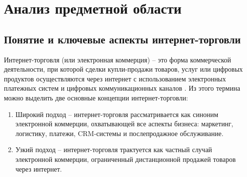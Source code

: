 \section{Анализ предметной области}
\subsection{Понятие и ключевые аспекты интернет-торговли}

Интернет-торговля (или электронная коммерция) – это форма коммерческой деятельности, при которой сделки купли-продажи товаров, услуг или цифровых продуктов осуществляются через интернет с использованием электронных платежных систем и цифровых коммуникационных каналов \cite{1}.
Из этого термина можно выделить две основные концепции интернет-торговли:

\begin{enumerate}
	\item Широкий подход – интернет-торговля рассматривается как синоним электронной коммерции, охватывающей все аспекты бизнеса: маркетинг, логистику, платежи, CRM-системы и послепродажное обслуживание.
	\item Узкий подход – интернет-торговля трактуется как частный случай электронной коммерции, ограниченный дистанционной продажей товаров через интернет.
\end{enumerate}

